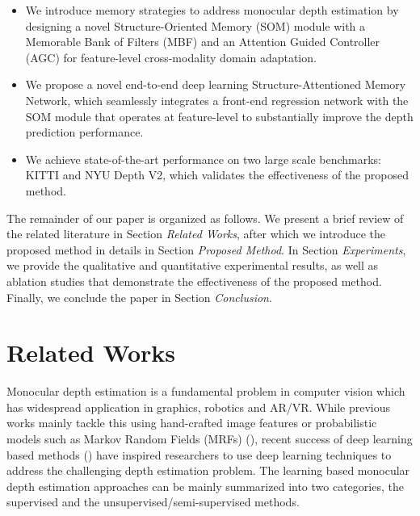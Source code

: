 \documentclass[letterpaper]{article} \usepackage{aaai20}  \usepackage{times}  \usepackage{helvet} \usepackage{courier}  \usepackage{graphicx} \frenchspacing  \setlength{\pdfpagewidth}{8.5in}  \setlength{\pdfpageheight}{11in}  \usepackage{epsfig}
\begin{document}
    \begin{itemize}
    \item We introduce memory strategies to address monocular depth estimation by designing a novel Structure-Oriented Memory (SOM) module with a Memorable Bank of Filters (MBF) and an Attention Guided Controller (AGC) for feature-level cross-modality domain adaptation.
      \item We propose a novel end-to-end deep learning Structure-Attentioned Memory Network, which seamlessly integrates a front-end regression network with the SOM module that operates at feature-level to substantially improve the depth prediction performance. 
    \item We achieve state-of-the-art performance on two large scale benchmarks: KITTI and NYU Depth V2, which validates the effectiveness of the proposed method. 
    \end{itemize}
    
    The remainder of our paper is organized as follows. We present a brief review of the related literature in Section \emph{Related Works}, after which we introduce the proposed method in details in Section \emph{Proposed Method}. In Section \emph{Experiments}, we provide the qualitative and quantitative experimental results, as well as ablation studies that demonstrate the effectiveness of the proposed method. Finally, we conclude the paper in Section \emph{Conclusion}. 
    
    \label{sec:related}
    \section{Related Works}
     Monocular depth estimation is a fundamental problem in computer vision which has widespread application in graphics, robotics and AR/VR. While previous works mainly tackle this using hand-crafted image features or probabilistic models such as Markov Random Fields (MRFs) (\cite{Saxena2009Make3D}), recent success of deep learning based methods (\cite{Wang2015Towards, Roy2016Monocular,Kuznietsov2017Semi,Kim2016Unified,Fu2018Deep, Eigen2015Predicting}) have inspired researchers to use deep learning techniques to address the challenging depth estimation problem. The learning based monocular depth estimation approaches can be mainly summarized into two categories, the supervised and the unsupervised/semi-supervised methods.
    
\end{document}
